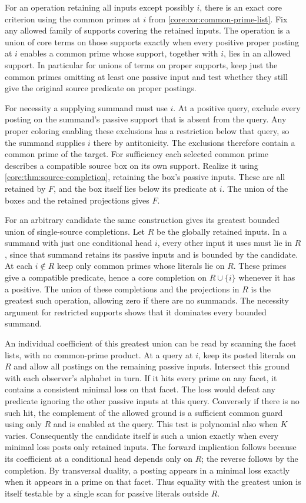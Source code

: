 For an operation retaining all inputs except
possibly $i$, there is an exact core criterion
using the common primes at $i$ from
\cref{core:cor:common-prime-list}. Fix any allowed
family of supports covering the retained inputs.
The operation is a union of core terms on those
supports exactly when every positive proper
posting at $i$ enables a common prime whose
support, together with $i$, lies in an allowed
support. In particular for unions of terms on
proper supports, keep just the common primes
omitting at least one passive input and test
whether they still give the original source
predicate on proper postings.

For necessity a supplying summand must use $i$.
At a positive query, exclude every posting on
the summand's passive support that is absent from
the query. Any proper coloring enabling these
exclusions has a restriction below that query,
so the summand supplies $i$ there by antitonicity.
The exclusions therefore contain a common
prime of the target. For sufficiency each
selected common prime describes a compatible
source box on its own support. Realize it using
\cref{core:thm:source-completion}, retaining the
box's passive inputs. These are all retained
by $F$, and the box itself lies below its
predicate at $i$. The union of the boxes and
the retained projections gives $F$.

For an arbitrary candidate the same construction
gives its greatest bounded union of single-source
completions. Let $R$ be the globally retained inputs.
In a summand with just one conditional head $i$,
every other input it uses must lie in $R$, since
that summand retains its passive inputs and is
bounded by the candidate. At each $i\notin R$ keep
only common primes whose literals lie on $R$.
These primes give a compatible predicate, hence
a core completion on $R\cup\{i\}$ whenever it
has a positive. The union of these completions
and the projections in $R$ is the greatest such
operation, allowing zero if there are no summands.
The necessity argument for restricted supports
shows that it dominates every bounded summand.

An individual coefficient of this greatest union
can be read by scanning the facet lists, with no
common-prime product. At a query at $i$, keep its
posted literals on $R$ and allow all postings on
the remaining passive inputs. Intersect this
ground with each observer's alphabet in turn.
If it hits every prime on any facet, it contains
a consistent minimal loss on that facet. The loss
would defeat any predicate ignoring the other
passive inputs at this query. Conversely if
there is no such hit, the complement of the
allowed ground is a sufficient common guard
using only $R$ and is enabled at the query.
This test is polynomial also when $K$ varies.
Consequently the candidate itself is such a union
exactly when every minimal loss posts only retained
inputs. The forward implication follows because
its coefficient at a conditional head depends only
on $R$; the reverse follows by the completion.
By transversal duality, a posting appears in a
minimal loss exactly when it appears in a prime
on that facet. Thus equality with the greatest
union is itself testable by a single scan for
passive literals outside $R$.

